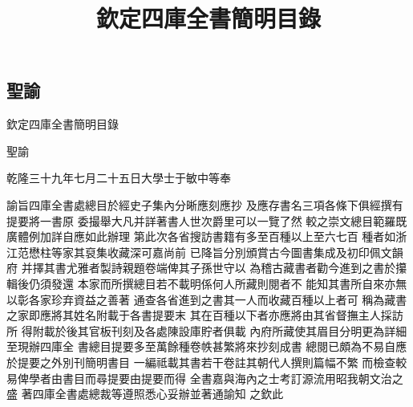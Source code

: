 \documentclass[四库全书文渊阁简明目录]{ltc-guji}
\title{欽定四庫全書簡明目錄}
\begin{document}
\begin{封面}[底色={231, 198, 83}]
\end{封面}


\begin{正文}
\chapter{聖諭}
欽定四庫全書簡明目錄

聖諭

\begin{段落}[indent=2]
乾隆三十九年七月二十五日大學士于敏中等奉
\end{段落}

\begin{段落}[indent=1, first-indent=0]
諭旨四庫全書處總目於經史子集內分晰應刻應抄%
及應存書名三項各條下俱經撰有提要將一書原%
委撮舉大凡并詳著書人世次爵里可以一覽了然%
較之崇文總目範羅既廣體例加詳自應如此辦理%
%
%
第此次各省搜訪書籍有多至百種以上至六七百%
種者如浙江范懋柱等家其裒集收藏深可嘉尚前%
已降旨分別頒賞古今圖書集成及初印佩文韻府%
并擇其書尤雅者製詩親題卷端俾其子孫世守以%
為稽古藏書者勸今進到之書於攥輯後仍須發還%
本家而所撰總目若不載明係何人所藏則閱者不%
能知其書所自來亦無以彰各家珍弃資益之善著%
通查各省進到之書其一人而收藏百種以上者可%
%
%
稱為藏書之家即應將其姓名附載于各書提要末%
其在百種以下者亦應將由其省督撫主人採訪所%
得附載於後其官板刊刻及各處陳設庫貯者俱載%
內府所藏使其眉目分明更為詳細至現辦四庫全%
書總目提要多至萬餘種卷帙甚繁將來抄刻成書%
總閱已頗為不易自應於提要之外別刊簡明書目%
一編祗載其書若干卷註其朝代人撰則篇幅不繁%
而檢查較易俾學者由書目而尋提要由提要而得%
%
%
全書嘉與海內之士考訂源流用昭我朝文治之盛%
著四庫全書處總裁等遵照悉心妥辦並著通諭知%
之欽此
\end{段落}
\newpage


\end{正文}
\end{document}
